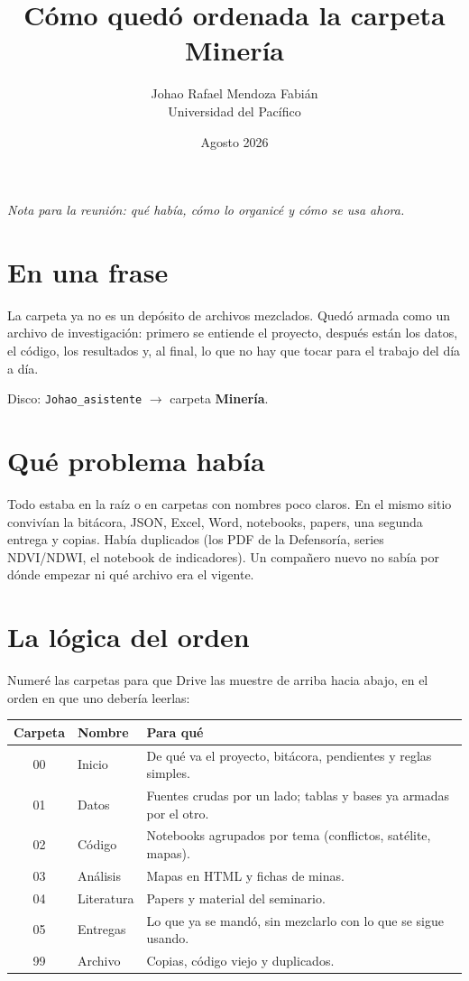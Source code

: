 \documentclass[11pt,a4paper]{article}
\title{Cómo quedó ordenada la carpeta Minería}
\author{Johao Rafael Mendoza Fabián\\Universidad del Pacífico}
\date{Agosto 2026}
\begin{document}
\maketitle
\vspace{-1.2em}

\begin{center}
\textit{Nota para la reunión: qué había, cómo lo organicé y cómo se usa ahora.}
\end{center}

\section{En una frase}

La carpeta ya no es un depósito de archivos mezclados. Quedó armada como un archivo de investigación: primero se entiende el proyecto, después están los datos, el código, los resultados y, al final, lo que no hay que tocar para el trabajo del día a día.

Disco: \texttt{Johao\_asistente} $\rightarrow$ carpeta \textbf{Minería}.

\section{Qué problema había}

Todo estaba en la raíz o en carpetas con nombres poco claros. En el mismo sitio convivían la bitácora, JSON, Excel, Word, notebooks, papers, una segunda entrega y copias. Había duplicados (los PDF de la Defensoría, series NDVI/NDWI, el notebook de indicadores). Un compañero nuevo no sabía por dónde empezar ni qué archivo era el vigente.

\section{La lógica del orden}

Numeré las carpetas para que Drive las muestre de arriba hacia abajo, en el orden en que uno debería leerlas:

\begin{center}
\begin{tabular}{@{}clp{9.2cm}@{}}
\toprule
\textbf{Carpeta} & \textbf{Nombre} & \textbf{Para qué} \\
\midrule
00 & Inicio & De qué va el proyecto, bitácora, pendientes y reglas simples. \\
01 & Datos & Fuentes crudas por un lado; tablas y bases ya armadas por el otro. \\
02 & Código & Notebooks agrupados por tema (conflictos, satélite, mapas). \\
03 & Análisis & Mapas en HTML y fichas de minas. \\
04 & Literatura & Papers y material del seminario. \\
05 & Entregas & Lo que ya se mandó, sin mezclarlo con lo que se sigue usando. \\
99 & Archivo & Copias, código viejo y duplicados. \\
\bottomrule
\end{tabular}
\end{center}
\end{document}
